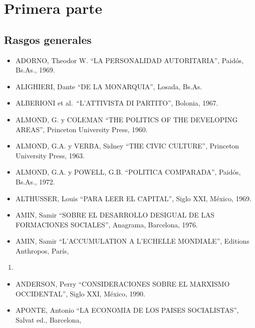 \documentclass[
]{book}
\providecommand{\tightlist}{%
  \setlength{\itemsep}{0pt}\setlength{\parskip}{0pt}}
\begin{document}
\hypertarget{primera-parte-3}{%
\section*{Primera parte}\label{primera-parte-3}}

\hypertarget{rasgos-generales-2}{%
\subsection*{Rasgos generales}\label{rasgos-generales-2}}

\begin{itemize}
\tightlist
\item
  ADORNO, Theodor W. ``LA PERSONALIDAD AUTORITARIA'', Paidós, Bs.As., 1969.
\item
  ALIGHIERI, Dante ``DE LA MONARQUIA'', Losada, Bs.As.
\item
  ALBERIONI et al.~``L'ATTIVISTA DI PARTITO'', Bolonia, 1967.
\item
  ALMOND, G. y COLEMAN ``THE POLITICS OF THE DEVELOPING AREAS'', Princeton
  University Press, 1960.
\item
  ALMOND, G.A. y VERBA, Sidney ``THE CIVIC CULTURE'', Princeton University Press, 1963.
\item
  ALMOND, G.A. y POWELL, G.B. ``POLITICA COMPARADA'', Paidós, Bs.As., 1972.
\item
  ALTHUSSER, Louis ``PARA LEER EL CAPITAL'', Siglo XXI, México, 1969.
\item
  AMIN, Samir ``SOBRE EL DESARROLLO DESIGUAL DE LAS FORMACIONES SOCIALES'',
  Anagrama, Barcelona, 1976.
\item
  AMIN, Samir ``L'ACCUMULATION A L'ECHELLE MONDIALE'', Editions Anthropos, París,
\end{itemize}

\begin{enumerate}
\def\labelenumi{\arabic{enumi}.}
\setcounter{enumi}{1969}
\tightlist
\item
\end{enumerate}

\begin{itemize}
\tightlist
\item
  ANDERSON, Perry ``CONSIDERACIONES SOBRE EL MARXISMO OCCIDENTAL'', Siglo XXI,
  México, 1990.
\item
  APONTE, Antonio ``LA ECONOMIA DE LOS PAISES SOCIALISTAS'', Salvat ed., Barcelona,
\end{itemize}
\end{document}

